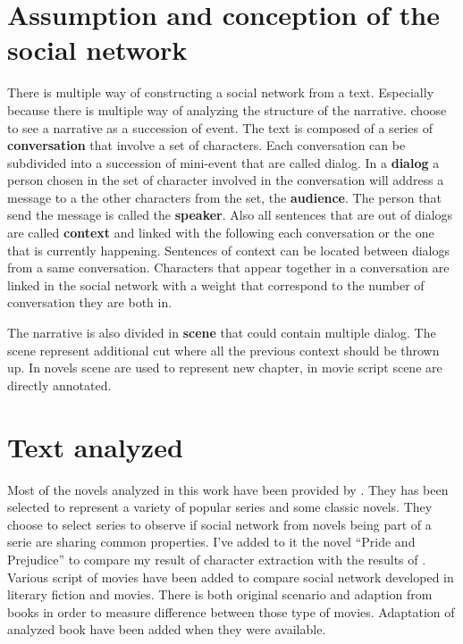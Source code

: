 \documentclass[a4paper, 12pt]{report}
\begin{document}
\section{Assumption and conception of the social network}
There is multiple way of constructing a social network from a text.  Especially because there is multiple way of analyzing the structure of the narrative. \cite{original} choose to see a narrative as a succession of event. The text is composed of a series of \textbf{conversation} that involve a set of characters. Each conversation can be subdivided into a succession of mini-event that are called dialog. In a \textbf{dialog} a person chosen in the set of character involved in the conversation will address a message to a the other characters from the set, the \textbf{audience}. The person that send the message is called the \textbf{speaker}. Also all sentences that are out of dialogs are called \textbf{context} and linked with the following each conversation or the one that is currently happening. Sentences of context can be located between dialogs from a same conversation. Characters that appear together in a conversation are linked in the social network with a weight that correspond to the number of conversation they are both in.

The narrative is also divided in \textbf{scene} that could contain multiple dialog. The scene represent additional cut where all the previous context should be thrown up. In novels scene are used to represent new chapter, in movie script scene are directly annotated.

\section{Text analyzed}
Most of the novels analyzed in this work have been provided by \cite{original}. They has been selected to represent a variety of popular series and some classic novels. They choose to select series to observe if social network from novels being part of a serie are sharing common properties.  I've added to it the novel ``Pride and Prejudice'' to compare my result of character extraction with the results of \cite{character_meta}.
Various script of movies have been added to compare social network developed in literary fiction and movies. There is both original scenario and adaption from books in order to measure difference between those type of movies. Adaptation of analyzed book have been added when they were available.
\end{document}
